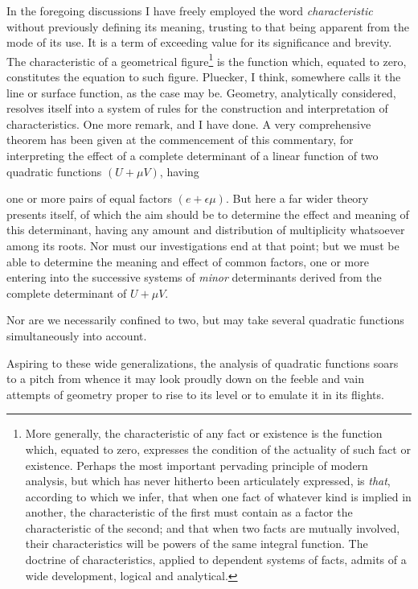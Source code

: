 \documentclass[11pt]{article}
\newcommand{\sourcepage}[1]{\marginpar{\scriptsize p.~#1}}
\begin{document}
{{In the foregoing discussions I have freely employed the word \emph{characteristic} without previously defining its meaning, trusting to that being apparent from the mode of its use. It is a term of exceeding value for its significance and brevity. The characteristic of a geometrical figure\footnote{More generally, the characteristic of any fact or existence is the function which, equated to zero, expresses the condition of the actuality of such fact or existence. Perhaps the most important pervading principle of modern analysis, but which has never hitherto been articulately expressed, is \emph{that}, according to which we infer, that when one fact of whatever kind is implied in another, the characteristic of the first must contain as a factor the characteristic of the second; and that when two facts are mutually involved, their characteristics will be powers of the same integral function. The doctrine of characteristics, applied to dependent systems of facts, admits of a wide development, logical and analytical.} is the function which, equated to zero, constitutes the equation to such figure. Pluecker, I think, somewhere calls it the line or surface function, as the case may be. Geometry, analytically considered, resolves itself into a system of rules for the construction and interpretation of characteristics. One more remark, and I have done. A very comprehensive theorem has been given at the commencement of this commentary, for interpreting the effect of a complete determinant of a linear function of two quadratic functions $(U+\mu V)$, having

\sourcepage{150}
one or more pairs of equal factors $(e+\epsilon\mu)$. But here a far wider theory presents itself, of which the aim should be to determine the effect and meaning of this determinant, having any amount and distribution of multiplicity whatsoever among its roots. Nor must our investigations end at that point; but we must be able to determine the meaning and effect of common factors, one or more entering into the successive systems of \emph{minor} determinants derived from the complete determinant of $U+\mu V$.

Nor are we necessarily confined to two, but may take several quadratic functions simultaneously into account.

Aspiring to these wide generalizations, the analysis of quadratic functions soars to a pitch from whence it may look proudly down on the feeble and vain attempts of geometry proper to rise to its level or to emulate it in its flights.

}}
\end{document}
